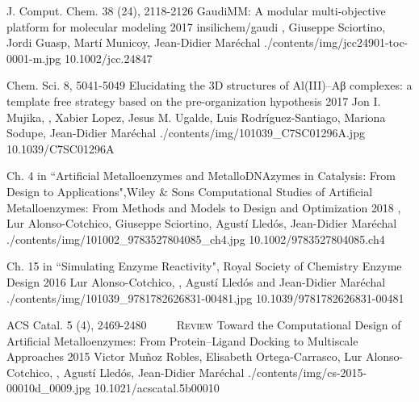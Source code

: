 \begin{cventries}
  \pubentry
    {J. Comput. Chem. 38 (24), 2118-2126} %
    {GaudiMM: A modular multi-objective platform for molecular modeling} %
    {2017} %
    {insilichem/gaudi} %
    {,\textsuperscript{\dagger} Giuseppe Sciortino, Jordi Guasp, Martí Municoy, Jean-Didier Maréchal\textsuperscript{\dagger}} %
    {./contents/img/jcc24901-toc-0001-m.jpg} %
    {10.1002/jcc.24847} %

    \pubentry
    {Chem. Sci. 8, 5041-5049} %
    {Elucidating the 3D structures of Al(III)–Aβ complexes: a template free strategy based on the pre-organization hypothesis} %
    {2017} %
    {} %
    {Jon I. Mujika, , Xabier Lopez, Jesus M. Ugalde, Luis Rodríguez-Santiago, Mariona Sodupe, Jean-Didier Maréchal} %
    {./contents/img/101039_C7SC01296A.jpg} %
    {10.1039/C7SC01296A} %

\end{cventries}

\begin{cventries}

  \pubentry
    {Ch. 4 in ``Artificial Metalloenzymes and MetalloDNAzymes in Catalysis: From Design to Applications",\newline Wiley \& Sons} %
    {Computational Studies of Artificial Metalloenzymes: From Methods and Models to Design and Optimization} %
    {2018} %
    {} %
    {, Lur Alonso-Cotchico, Giuseppe Sciortino, Agustí Lledós, Jean-Didier Maréchal} %
    {./contents/img/101002_9783527804085_ch4.jpg} %
    {10.1002/9783527804085.ch4} %

    \pubentry
    {Ch. 15 in ``Simulating Enzyme Reactivity", Royal Society of Chemistry} %
    {Enzyme Design} %
    {2016} %
    {} %
    {Lur Alonso-Cotchico, , Agustí Lledós and Jean-Didier Maréchal} %
    {./contents/img/101039_9781782626831-00481.jpg} %
    {10.1039/9781782626831-00481} %

  \pubentry
    {ACS Catal. 5 (4), 2469-2480 ~~\cdot~~ \scshape{Review}} %
    {Toward the Computational Design of Artificial Metalloenzymes: From Protein–Ligand Docking to Multiscale Approaches} %
    {2015} %
    {} %
    {Victor Muñoz Robles, Elisabeth Ortega-Carrasco, Lur Alonso-Cotchico, , Agustí Lledós, Jean-Didier Maréchal} %
    {./contents/img/cs-2015-00010d_0009.jpg} %
    {10.1021/acscatal.5b00010} %

\end{cventries}

